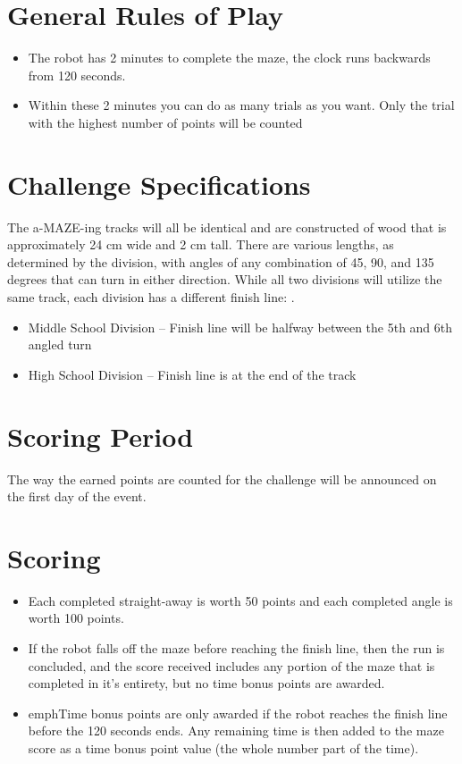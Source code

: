 \documentclass[a4paper,12pt]{article}
\begin{document}
\section{General Rules of Play}
\begin{itemize}
\item The robot has 2 minutes to complete the maze, the clock runs backwards from 120 seconds.
\item Within these 2 minutes you can do as many trials as you want. Only the trial with the highest
number of points will be counted
\end{itemize}
\section{Challenge Specifications}
The a-MAZE-ing tracks will all be identical and are constructed of wood that is approximately 24 cm wide and 2
cm tall. There are various lengths, as determined by the division, with angles of any combination of 45, 90, and
135 degrees that can turn in either direction.
While all two divisions will utilize the same track, each division has a different finish line:
.
\begin{itemize}
\item Middle School Division – Finish line will be halfway between the 5th and 6th angled turn
\item High School Division – Finish line is at the end of the track
\end{itemize}
\section{Scoring Period}
\par The way the earned points are counted for the challenge will be announced on the first day of the event.
\section{Scoring}
\begin{itemize}
\item Each completed straight-away is worth 50 points and each completed angle is worth 100 points.
\item If the robot falls off the maze before reaching the finish line, then the run is concluded, and the score received
includes any portion of the maze that is completed in it’s entirety, but no time bonus points are awarded.
\item emph{Time bonus} points are only awarded if the robot reaches the finish line before the 120 seconds ends. Any
remaining time is then added to the maze score as a time bonus point value (the whole number part of the
time).
\end{itemize}
\end{document}
